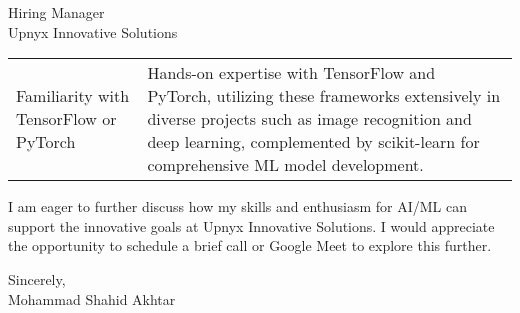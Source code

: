 \documentclass[11pt]{letter}
\begin{document}
\begin{letter}{Hiring Manager\\
Upnyx Innovative Solutions\\
 }
{\begin{tabularx}{\textwidth}{@{}p{}X@{}}
Familiarity with TensorFlow or PyTorch & Hands-on expertise with TensorFlow and PyTorch, utilizing these frameworks extensively in diverse projects such as image recognition and deep learning, complemented by scikit-learn for comprehensive ML model development. \\

\end{tabularx}
}

\vspace{0.4cm}
I am eager to further discuss how my skills and enthusiasm for AI/ML can support the innovative goals at Upnyx Innovative Solutions. I would appreciate the opportunity to schedule a brief call or Google Meet to explore this further.

\vspace{0.4cm}
\begin{flushleft}
Sincerely,\\
[1.5ex]
Mohammad Shahid Akhtar
\end{flushleft}

\end{letter}
\end{document}
